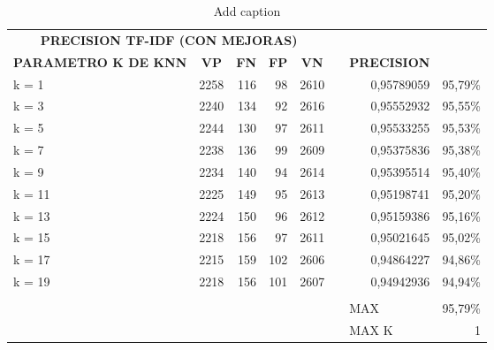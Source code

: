 \documentclass{article}
\begin{document}
\begin{table}[htbp]
  \centering
  \caption{Add caption}
    \begin{tabular}{rrrrrrlr}
    \multicolumn{5}{c}{\textbf{PRECISION TF-IDF (CON MEJORAS)}} &       &       &  \\
    \multicolumn{1}{c}{\textbf{PARAMETRO K DE KNN}} & \multicolumn{1}{c}{\textbf{VP}} & \multicolumn{1}{c}{\textbf{FN}} & \multicolumn{1}{c}{\textbf{FP}} & \multicolumn{1}{c}{\textbf{VN}} &       & \textbf{PRECISION} &  \\
    \multicolumn{1}{l}{k = 1} & 2258  & 116   & 98    & 2610  &       & \multicolumn{1}{r}{0,95789059} & 95,79\% \\
    \multicolumn{1}{l}{k = 3} & 2240  & 134   & 92    & 2616  &       & \multicolumn{1}{r}{0,95552932} & 95,55\% \\
    \multicolumn{1}{l}{k = 5} & 2244  & 130   & 97    & 2611  &       & \multicolumn{1}{r}{0,95533255} & 95,53\% \\
    \multicolumn{1}{l}{k = 7} & 2238  & 136   & 99    & 2609  &       & \multicolumn{1}{r}{0,95375836} & 95,38\% \\
    \multicolumn{1}{l}{k = 9} & 2234  & 140   & 94    & 2614  &       & \multicolumn{1}{r}{0,95395514} & 95,40\% \\
    \multicolumn{1}{l}{k = 11} & 2225  & 149   & 95    & 2613  &       & \multicolumn{1}{r}{0,95198741} & 95,20\% \\
    \multicolumn{1}{l}{k = 13} & 2224  & 150   & 96    & 2612  &       & \multicolumn{1}{r}{0,95159386} & 95,16\% \\
    \multicolumn{1}{l}{k = 15} & 2218  & 156   & 97    & 2611  &       & \multicolumn{1}{r}{0,95021645} & 95,02\% \\
    \multicolumn{1}{l}{k = 17} & 2215  & 159   & 102   & 2606  &       & \multicolumn{1}{r}{0,94864227} & 94,86\% \\
    \multicolumn{1}{l}{k = 19} & 2218  & 156   & 101   & 2607  &       & \multicolumn{1}{r}{0,94942936} & 94,94\% \\
          &       &       &       &       &       &       &  \\
          &       &       &       &       &       & MAX   & 95,79\% \\
          &       &       &       &       &       & MAX K & 1 \\
    \end{tabular}%
  \label{tab:addlabel}%
\end{table}%
\end{document}
